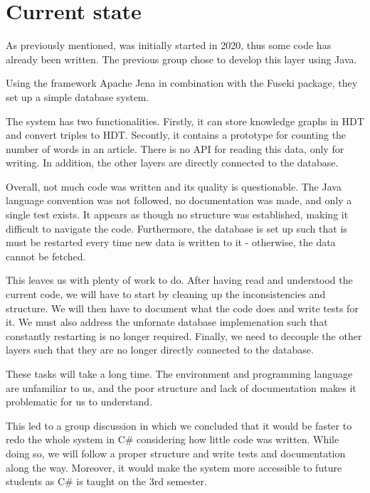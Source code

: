 \section{Current state}

As previously mentioned, \knox{} was initially started in 2020, thus some code has already been written.
The previous group chose to develop this layer using Java.

Using the framework Apache Jena in combination with the Fuseki package, they set up a simple database system.

The system has two functionalities. 
Firstly, it can store knowledge graphs in HDT and convert triples to HDT.
Secontly, it contains a prototype for counting the number of words in an article.
There is no API for reading this data, only for writing. 
In addition, the other layers are directly connected to the database.

Overall, not much code was written and its quality is questionable. 
The Java language convention was not followed, no documentation was made, and only a single test exists. 
It appears as though no structure was established, making it difficult to navigate the code. 
Furthermore, the database is set up such that is must be restarted every time new data is written to it - otherwise, the data cannot be fetched.

This leaves us with plenty of work to do.
After having read and understood the current code, we will have to start by cleaning up the inconsistencies and structure.
We will then have to document what the code does and write tests for it.
We must also address the unfornate database implemenation such that constantly restarting is no longer required.
Finally, we need to decouple the other layers such that they are no longer directly connected to the database.

These tasks will take a long time.
The environment and programming language are unfamiliar to us, and the poor structure and lack of documentation makes it problematic for us to understand.

This led to a group discussion in which we concluded that it would be faster to redo the whole system in C# considering how little code was written. 
While doing so, we will follow a proper structure and write tests and documentation along the way. 
Moreover, it would make the system more accessible to future students as C# is taught on the 3rd semester.  
